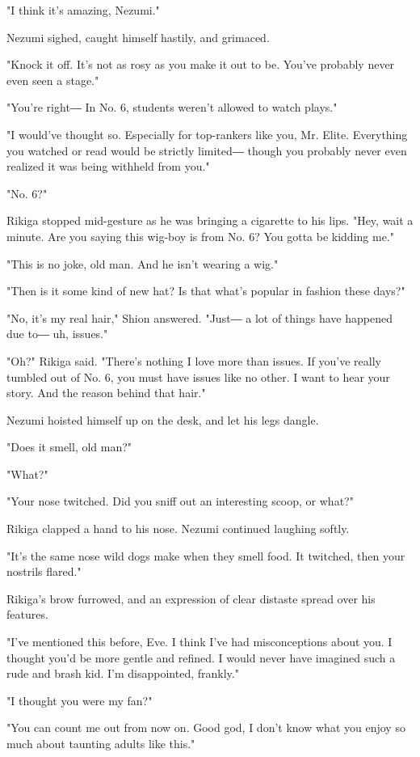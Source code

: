 "I think it's amazing, Nezumi."

Nezumi sighed, caught himself hastily, and grimaced.

"Knock it off. It's not as rosy as you make it out to be. You've
probably never even seen a stage."

"You're right― In No. 6, students weren't allowed to watch plays."

"I would've thought so. Especially for top-rankers like you, Mr. Elite.
Everything you watched or read would be strictly limited― though you
probably never even realized it was being withheld from you."

"No. 6?"

Rikiga stopped mid-gesture as he was bringing a cigarette to his lips.
"Hey, wait a minute. Are you saying this wig-boy is from No. 6? You
gotta be kidding me."

"This is no joke, old man. And he isn't wearing a wig."

"Then is it some kind of new hat? Is that what's popular in fashion
these days?"

"No, it's my real hair," Shion answered. "Just― a lot of things have
happened due to― uh, issues."

"Oh?" Rikiga said. "There's nothing I love more than issues. If you've
really tumbled out of No. 6, you must have issues like no other. I want
to hear your story. And the reason behind that hair."

Nezumi hoisted himself up on the desk, and let his legs dangle.

"Does it smell, old man?"

"What?"

"Your nose twitched. Did you sniff out an interesting scoop, or what?"

Rikiga clapped a hand to his nose. Nezumi continued laughing softly.

"It's the same nose wild dogs make when they smell food. It twitched,
then your nostrils flared."

Rikiga's brow furrowed, and an expression of clear distaste spread over
his features.

"I've mentioned this before, Eve. I think I've had misconceptions about
you. I thought you'd be more gentle and refined. I would never have
imagined such a rude and brash kid. I'm disappointed, frankly."

"I thought you were my fan?"

"You can count me out from now on. Good god, I don't know what you enjoy
so much about taunting adults like this."

